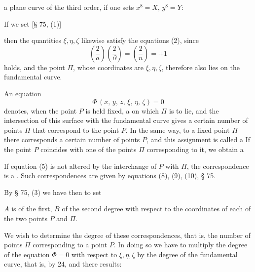 a plane curve of the third order, if one sets $x^8=X$,
$y^8=Y$:


If we set [§ 75, (1)]


then the quantities $\xi, \eta, \zeta$ likewise satisfy the equations (2), since %
\[
\left(\dfrac{2}{a}\right)\left(\dfrac{2}{\partial}\right)=\left(\dfrac{2}{n}\right)=+1
\]
holds, and the point $\Pi$, whose coordinates are $\xi, \eta, \zeta$, therefore also lies
on the fundamental curve.

An equation
\[
\Phi\,(x,\,y,\,z,\,\xi,\,\eta,\,\zeta)=0
\]
denotes, when the point $P$ is held fixed, a  on
which $\Pi$ is to lie, and the intersection of this surface with the
fundamental curve gives a certain number of points $\Pi$ that correspond to the
point $P$. In the same way, to a fixed point $\Pi$ there corresponds
a certain number of points $P$, and this assignment is called
a  If the point $P$
coincides with one of the points $\Pi$ corresponding to it, we obtain a 

If equation (5) is not altered by the interchange of $P$ with $\Pi$,
the correspondence is a .
Such correspondences are given by equations (8), (9),
(10), § 75.

By § 75, (3) we have then to set


$A$ is of the first, $B$ of the second degree with respect to
the coordinates of each of the two points $P$ and $\Pi$.

We wish to determine the degree of these correspondences, that is, the
number of points $\Pi$ corresponding to a point $P$. In doing so we have to multiply the degree of the equation $\Phi=0$ with
respect to $\xi, \eta, \zeta$ by the degree of the fundamental curve, that is, by 24,
and there results:
